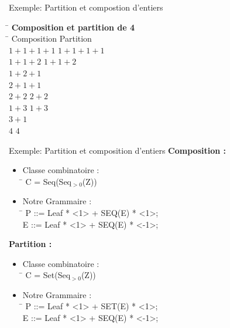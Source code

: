 \documentclass{beamer}
\begin{document}
\begin{frame}{Exemple: Partition et compostion d'entiers}
\begin{tabbing}
\hspace{1cm} \= \kill
\> \textbf{Composition et partition de 4}\\
\hspace{5cm} \= \kill
Composition \> Partition \\ 

$ 1 + 1 + 1 + 1 $ \> $ 1 +1 +1 +1 $\\
$ 1 + 1 + 2 $ \> $ 1 + 1 + 2 $\\
$ 1 + 2 + 1 $ \\
$ 2 + 1 + 1 $ \\
$ 2 + 2 $ \> $ 2 + 2 $ \\
$ 1 + 3 $ \> $ 1 + 3 $\\
$ 3 + 1 $ \\
$ 4 $ \> $ 4 $\\
\end{tabbing}
\end{frame}

\begin{frame}{Exemple: Partition et composition d'entiers}
\textbf{Composition :}\\
\begin{itemize}
\item
\begin{tabbing}
Classe combinatoire : \\
\hspace{0.5cm} \= \kill
\> C = Seq(Seq$_{>0}$(Z)) \\
\end{tabbing}
\item
\begin{tabbing}
Notre Grammaire : \\
\hspace{0.5cm} \= \kill
\hspace{0.5cm} 
\> P ::= Leaf * <1> + SEQ(E) * <1>; \\
\> E ::= Leaf * <1> + SEQ(E) * <-1>; \\
\end{tabbing}
\end{itemize} 
\textbf{Partition :}
\begin{itemize}
\item
\begin{tabbing}
Classe combinatoire : \\
\hspace{0.5cm} \= \kill
\> C = Set(Seq$_{>0}$(Z)) \\
\end{tabbing}
\item
\begin{tabbing}
Notre Grammaire : \\
\hspace{0.5cm} \= \kill
\hspace{0.5cm} 
\> P ::= Leaf * <1> + SET(E) * <1>; \\
\> E ::= Leaf * <1> + SEQ(E) * <-1>; \\
\end{tabbing}
\end{itemize} 
\end{frame}
\end{document}
